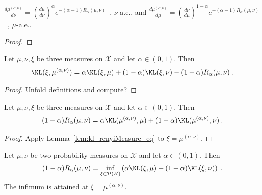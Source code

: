 \begin{lemma}
  \label{lem:rnDeriv_renyiMeasure}
  $\frac{d \mu^{(\alpha, \nu)}}{d \nu} = \left(\frac{d\mu}{d\nu}\right)^\alpha e^{-(\alpha - 1) R_\alpha(\mu, \nu)}$~, $\nu$-a.e.,
  and
  $\frac{d \mu^{(\alpha, \nu)}}{d \mu} = \left(\frac{d\nu}{d\mu}\right)^{1 - \alpha} e^{-(\alpha - 1) R_\alpha(\mu, \nu)}$~, $\mu$-a.e..
\end{lemma}

\begin{proof}%
{}

\end{proof}


\begin{lemma}
  \label{lem:kl_renyiMeasure_eq}
  Let $\mu, \nu, \xi$ be three measures on $\mathcal X$ and let $\alpha \in (0, 1)$. Then
  \begin{align*}
  \KL(\xi, \mu^{(\alpha, \nu)}) = \alpha \KL(\xi, \mu) + (1 - \alpha)\KL(\xi, \nu) - (1 - \alpha) R_\alpha(\mu, \nu) \: .
  \end{align*}
\end{lemma}

\begin{proof}
Unfold definitions and compute?
\end{proof}


\begin{corollary}
  \label{cor:renyi_eq_add_kl}
  Let $\mu, \nu, \xi$ be three measures on $\mathcal X$ and let $\alpha \in (0, 1)$. Then
  \begin{align*}
  (1 - \alpha) R_\alpha(\mu, \nu) = \alpha \KL(\mu^{(\alpha, \nu)}, \mu) + (1 - \alpha)\KL(\mu^{(\alpha, \nu)}, \nu) \: .
  \end{align*}
\end{corollary}

\begin{proof}
Apply Lemma~\ref{lem:kl_renyiMeasure_eq} to $\xi = \mu^{(\alpha, \nu)}$.
\end{proof}


\begin{lemma}
  \label{lem:renyi_eq_inf_add_kl}
  Let $\mu, \nu$ be two probability measures on $\mathcal X$ and let $\alpha \in (0, 1)$. Then
  \begin{align*}
  (1 - \alpha) R_\alpha(\mu, \nu) = \inf_{\xi \in \mathcal P(\mathcal X)}\left( \alpha \KL(\xi, \mu) + (1 - \alpha)\KL(\xi, \nu) \right) \: .
  \end{align*}
  The infimum is attained at $\xi = \mu^{(\alpha, \nu)}$.
\end{lemma}

